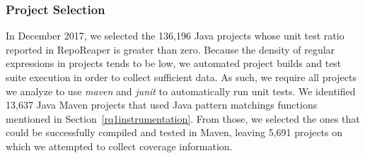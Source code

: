 \subsubsection{Project Selection}
In December 2017, we selected the 136,196 Java projects whose unit test ratio reported in RepoReaper is greater than zero. %
Because the density of regular expressions in projects tends to be low, we automated project builds and test suite execution in order to collect sufficient data. As such, we require all projects we analyze to use 
\textit{maven} and \textit{junit} to automatically run unit tests. 
We identified 13,637 Java Maven projects that used Java pattern matchings functions mentioned in Section~\ref{rq1instrumentation}. From those, we selected the ones that could be successfully compiled and tested in Maven, leaving 5,691  projects on which we attempted to collect coverage information. 





